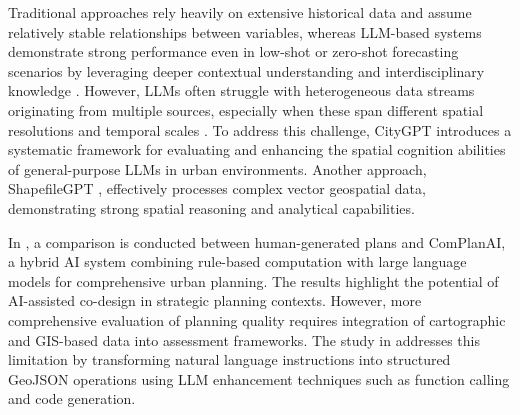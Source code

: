 Traditional approaches rely heavily on extensive historical data and assume relatively stable relationships between variables, whereas LLM-based systems demonstrate strong performance even in low-shot or zero-shot forecasting scenarios by leveraging deeper contextual understanding and interdisciplinary knowledge \cite{pan2025tools}.
However, LLMs often struggle with heterogeneous data streams originating from multiple sources, especially when these span different spatial resolutions and temporal scales \cite{luo2026geojson}.
To address this challenge, CityGPT \cite{feng2025citygpt} introduces a systematic framework for evaluating and enhancing the spatial cognition abilities of general-purpose LLMs in urban environments.
Another approach, ShapefileGPT \cite{lin2025shapefilegpt}, effectively processes complex vector geospatial data, demonstrating strong spatial reasoning and analytical capabilities.

In \cite{sung5382891planning}, a comparison is conducted between human-generated plans and ComPlanAI, a hybrid AI system combining rule-based computation with large language models for comprehensive urban planning.
The results highlight the potential of AI-assisted co-design in strategic planning contexts.
However, more comprehensive evaluation of planning quality requires integration of cartographic and GIS-based data into assessment frameworks.
The study in \cite{luo2026geojson} addresses this limitation by transforming natural language instructions into structured GeoJSON operations using LLM enhancement techniques such as function calling and code generation.